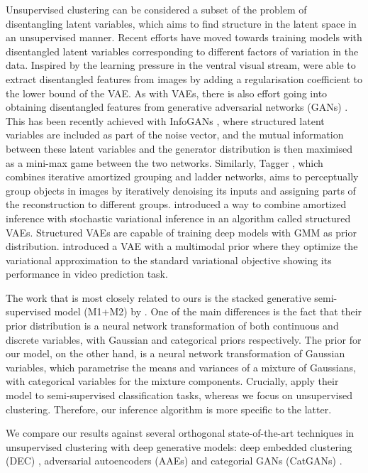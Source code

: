 \documentclass{article} \usepackage{iclr2017_conference,times}
\begin{document}
Unsupervised clustering can be considered a subset of the problem of disentangling latent variables, which aims to find structure in the latent space in an unsupervised manner. Recent efforts have moved towards training models with disentangled latent variables corresponding to different factors of variation in the data. Inspired by the learning pressure in the ventral visual stream, \cite{higgins2016early} were able to extract disentangled features from images by adding a regularisation coefficient to the lower bound of the VAE. As with VAEs, there is also effort going into obtaining disentangled features from generative adversarial networks (GANs) \citep{goodfellow2014generative}. This has been recently achieved with InfoGANs \citep{chen2016infogan}, where structured latent variables are included as part of the noise vector, and the mutual information between these latent variables and the generator distribution is then maximised as a mini-max game between the two networks. Similarly, Tagger \citep{greff2016tagger}, which combines iterative amortized grouping and ladder networks, aims to perceptually group objects in images by iteratively denoising its inputs and assigning parts of the reconstruction to different groups. \cite{johnson2016composing} introduced a way to combine amortized inference with stochastic variational inference in an algorithm called structured VAEs. Structured VAEs are capable of training deep models with GMM as prior distribution. \cite{shu2016stochastic} introduced a VAE with a multimodal prior where they optimize the variational approximation to the standard variational objective showing its performance in video prediction task.

The work that is most closely related to ours is the stacked generative semi-supervised model (M1+M2) by \cite{kingma2014semi}. One of the main differences is the fact that their prior distribution is a neural network transformation of both continuous and discrete variables, with Gaussian and categorical priors respectively. The prior for our model, on the other hand, is a neural network transformation of Gaussian variables, which parametrise the means and variances of a mixture of Gaussians, with categorical variables for the mixture components. Crucially, \cite{kingma2014semi} apply their model to semi-supervised classification tasks, whereas we focus on unsupervised clustering. Therefore, our inference algorithm is more specific to the latter.

We compare our results against several orthogonal state-of-the-art techniques in unsupervised clustering with deep generative models: deep embedded clustering (DEC) \citep{xie2015unsupervised}, adversarial autoencoders (AAEs) \citep{makhzani2015adversarial} and categorial GANs (CatGANs) \citep{springenberg2015unsupervised}.
\end{document}
